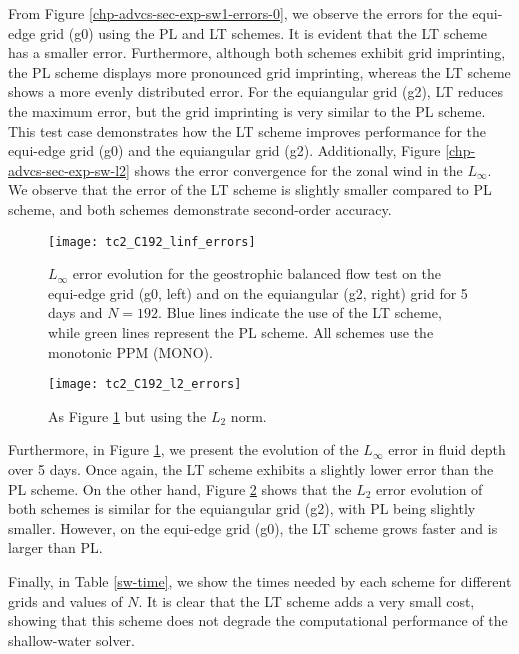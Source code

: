 \newpage
From Figure \ref{chp-advcs-sec-exp-sw1-errors-0}, we observe the errors for the equi-edge grid (g0) using the PL and LT schemes. It is evident that the LT scheme has a smaller error. Furthermore, although both schemes exhibit grid imprinting, the PL scheme displays more pronounced grid imprinting, whereas the LT scheme shows a more evenly distributed error.
For the equiangular grid (g2), LT reduces the maximum error, but the grid imprinting is very similar to the PL scheme.
This test case demonstrates how the LT scheme improves performance for the equi-edge grid (g0) and the equiangular grid (g2).
Additionally, Figure \ref{chp-advcs-sec-exp-sw-l2} shows the error convergence for the zonal wind in the $L_{\infty}$. 
We observe that the error of the LT scheme is slightly smaller compared to PL scheme, and both schemes demonstrate second-order accuracy.
\begin{figure}[!htb]
	\centering
	\texttt{[image: tc2\_C192\_linf\_errors]}
	\caption{
		$L_{\infty}$ error evolution for the geostrophic balanced flow test  on the equi-edge grid (g0, left)
		 and on the equiangular (g2, right) grid for 5 days and $N=192$.
		Blue lines indicate the use of the LT scheme, while green lines represent the PL scheme. All schemes use the monotonic PPM (MONO).
		\label{chp-advcs-sec-exp-sw-evol-linf}}
\end{figure}
\begin{figure}[!htb]
	\centering
	\texttt{[image: tc2\_C192\_l2\_errors]}
	\caption{ As Figure \ref{chp-advcs-sec-exp-sw-evol-linf} but using the 
		$L_{2}$ norm.
		\label{chp-advcs-sec-exp-sw-evol-l2}}
\end{figure}

Furthermore, in Figure \ref{chp-advcs-sec-exp-sw-evol-linf}, we present the evolution of the $L_{\infty}$ error in fluid depth over 5 days. 
Once again, the LT scheme exhibits a slightly lower error than the PL scheme.
On the other hand, Figure \ref{chp-advcs-sec-exp-sw-evol-l2} shows that the $L_2$ error evolution 
of both schemes is similar for the equiangular grid (g2), with PL being slightly smaller. However, on the equi-edge grid (g0), the LT scheme grows faster and is larger than PL.



Finally, in Table \ref{sw-time}, we show the times needed by each scheme for different grids and values of $N$. 
It is clear that the LT scheme adds a very small cost, showing that this scheme does not degrade the computational performance of the shallow-water solver.

